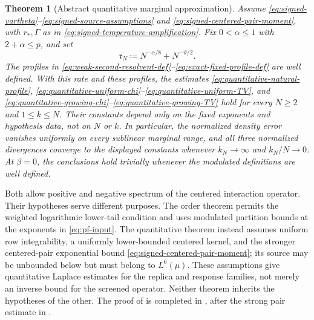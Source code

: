 \documentclass[11pt,reqno]{amsart}
\numberwithin{equation}{section}
\theoremstyle{plain}
\newtheorem{thm}{Theorem}[section]
\theoremstyle{remark}
\newcommand{\be}{\beta}
\begin{document}
\begin{thm}[Abstract quantitative marginal approximation]
\label{thm:abstract-quantitative-marginal}
Assume \eqref{eq:signed-vartheta}--\eqref{eq:signed-source-assumptions} and
\eqref{eq:signed-centered-pair-moment}, with $r_*,\Gamma$ as in
\eqref{eq:signed-temperature-amplification}.  Fix $0<\alpha\leq1$ with
$2+\alpha\leq p$, and set
\begin{equation}\label{eq:signed-profile-rate}
 \mathfrak r_N\coloneqq N^{-\alpha/8}+N^{-\vartheta/2}.
\end{equation}
The profiles in \eqref{eq:weak-second-resolvent-def}--\eqref{eq:exact-fixed-profile-def}
are well defined.  With this rate and these profiles, the estimates
\eqref{eq:quantitative-natural-profile},
\eqref{eq:quantitative-uniform-chi}--\eqref{eq:quantitative-uniform-TV}, and
\eqref{eq:quantitative-growing-chi}--\eqref{eq:quantitative-growing-TV}
hold for every $N\geq2$ and $1\leq k\leq N$.
Their constants depend only on the fixed exponents and hypothesis data,
not on $N$ or $k$.  In particular, the normalized density error vanishes
uniformly on every sublinear marginal range, and all three normalized
divergences converge to the displayed constants whenever $k_N\to\infty$
and $k_N/N\to0$.  At $\be=0$, the conclusions hold trivially whenever the
modulated definitions are well defined.
\end{thm}

Both  allow
positive and negative spectrum of the centered interaction operator.
Their hypotheses serve different purposes.  The order theorem permits the
weighted logarithmic lower-tail condition and uses modulated partition
bounds at the exponents in \eqref{eq:pf-input}.  The quantitative theorem
instead assumes uniform row integrability, a uniformly lower-bounded
centered kernel, and the stronger centered-pair exponential bound
\eqref{eq:signed-centered-pair-moment}; its source may be unbounded below
but must belong to $L^6(\mu)$.  These assumptions give quantitative Laplace
estimates for the replica and response families, not merely an inverse
bound for the screened operator.  Neither theorem inherits the hypotheses
of the other.  The proof of  is
completed in , after the strong pair
estimate in .
\end{document}
